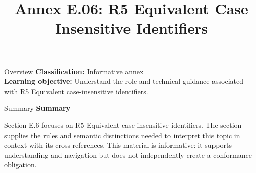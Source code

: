\documentclass[10pt,letterpaper]{article}
\title{Annex E.06: R5 Equivalent Case Insensitive Identifiers}
\author{}
\date{}
\begin{document}
\maketitle
\begin{CornellOverviewBox}{Overview}
\textbf{Classification:} Informative annex\\[2pt]
\textbf{Learning objective:} Understand the role and technical guidance associated with R5 Equivalent case-insensitive identifiers.
\end{CornellOverviewBox}\begin{CornellSummaryBox}{Summary}
{\sffamily\bfseries\color{Accent} Summary}\par\vspace{3pt}Section E.6 focuses on R5 Equivalent case-insensitive identifiers. The section supplies the rules and semantic distinctions needed to interpret this topic in context with its cross-references. This material is informative: it supports understanding and navigation but does not independently create a conformance obligation.
\end{CornellSummaryBox}
\end{document}
